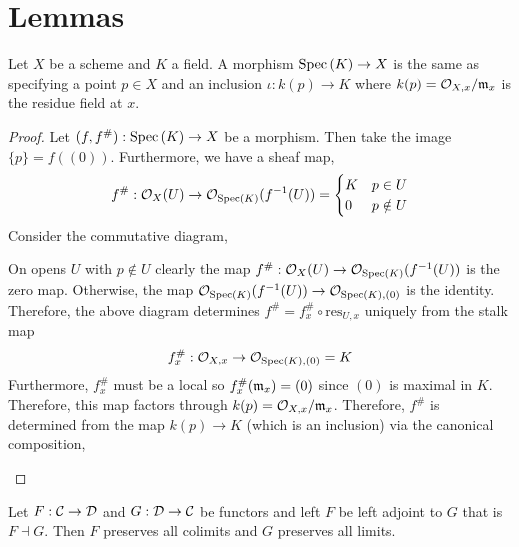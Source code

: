 \documentclass[12pt]{article}
\begin{document}
\section{Lemmas}

\begin{lemma} \label{functor_of_points}
Let $X$ be a scheme and $K$ a field. A morphism $\mathrm{Spec}\left( K \right) \to X$ is the same as specifying a point $p \in X$ and an inclusion $\iota : k(p) \to K$ where $k(p) = \mathcal{O}_{X, x} / \mathfrak{m}_x$ is the residue field at $x$.
\end{lemma}


\begin{proof}
Let $(f, f^\#) : \mathrm{Spec}\left( K \right) \to X$ be a morphism. Then take the image $\{p\} = f((0))$. Furthermore, we have a sheaf map,
\[ f^\# : \mathcal{O}_{X}(U) \to \mathcal{O}_{\mathrm{Spec}\left( K \right)}(f^{-1}(U)) 
= \begin{cases}
K & p \in U
\\
0 & p \notin U 
\end{cases} \] 
Consider the commutative diagram,
\begin{center}
\end{center}
On opens $U$ with $p \notin U$ clearly the map $f^\# : \mathcal{O}_{X}(U) \to \mathcal{O}_{\mathrm{Spec}\left( K \right)}(f^{-1}(U))$ is the zero map. Otherwise, the map $\mathcal{O}_{\mathrm{Spec}\left( K \right)}(f^{-1}(U)) \to \mathcal{O}_{\mathrm{Spec}\left( K \right), (0)}$ is the identity. Therefore, the above diagram determines $f^\# = f^\#_x \circ \mathrm{res}_{U, x}$ uniquely from the stalk map 
\[f^\#_x : \mathcal{O}_{X, x} \to \mathcal{O}_{\mathrm{Spec}\left( K \right), (0)} = K \]
Furthermore, $f^\#_x$ must be a local so $f^\#_x(\mathfrak{m}_x) = (0)$ since $(0)$ is maximal in $K$. Therefore, this map factors through $k(p) = \mathcal{O}_{X, x} / \mathfrak{m}_x$. Therefore, $f^\#$ is determined from the map $k(p) \to K$ (which is an inclusion) via the canonical composition,
\begin{center}
\end{center} 
\end{proof}

\begin{lemma} \label{abstract_nonsense}
Let $F : \mathcal{C} \to \mathcal{D}$ and $G : \mathcal{D} \to \mathcal{C}$ be functors and left $F$ be left adjoint to $G$ that is $F \dashv G$. Then $F$ preserves all colimits and $G$ preserves all limits.
\end{lemma}
\end{document}
